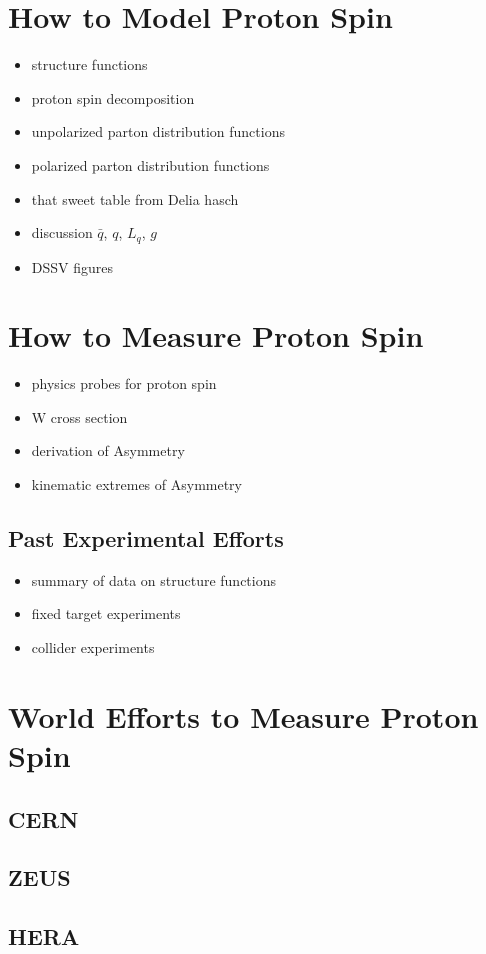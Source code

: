 \section{How to Model Proton Spin}
\begin{itemize}
		\item structure functions
		\item proton spin decomposition
		\item unpolarized parton distribution functions
		\item polarized parton distribution functions
		\item that sweet table from Delia hasch
		\item discussion $\bar{q}$, $q$, $L_q$, $g$
		\item DSSV figures
\end{itemize}
\section{How to Measure Proton Spin}
\begin{itemize}
		\item physics probes for proton spin
		\item W cross section
		\item derivation of Asymmetry
		\item kinematic extremes of Asymmetry
\end{itemize}
\subsection{Past Experimental Efforts}
\begin{itemize}
		\item summary of data on structure functions
		\item fixed target experiments
		\item collider experiments
\end{itemize}

\section{World Efforts to Measure Proton Spin}
\subsection{CERN}
\subsection{ZEUS}
\subsection{HERA}
